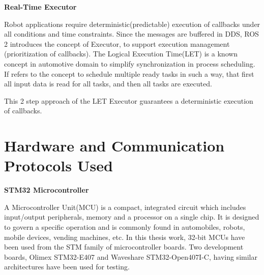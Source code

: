 \documentclass[%
xelatex,
	oneside,		%
	12pt,			%
	parskip=half,	%
	abstracton,
	chapterprefix=true%
    appendixprefix=true]
{scrbook}
\begin{document}
 
  \vspace*{0.5cm}
  
  {\bfseries Real-Time Executor}
  \vspace*{0.5cm}
  
  
Robot applications require deterministic(predictable) execution of callbacks under all conditions and time constraints. Since the messages are buffered in DDS, ROS 2  introduces the concept of Executor, to support execution management (prioritization of callbacks).
The Logical Execution Time(LET) is a known concept in automotive domain to simplify synchronization in process scheduling. If refers to the concept to schedule multiple ready tasks in such a way, that first all input data is read for all tasks, and then all tasks are executed.\cite{let}

This 2 step approach of the LET Executor guarantees a deterministic execution of callbacks.
 
	\section{Hardware and Communication Protocols Used}
	
	\vspace*{0.5cm}
	{\bfseries STM32 Microcontroller}
	
	
	\vspace*{0.5cm}
A Microcontroller Unit(MCU)	is a compact, integrated circuit which includes input/output peripherals, memory and a processor on a single chip. It is designed to govern a specific operation and is commonly found in automobiles, robots, mobile devices, vending machines, etc. In this thesis work, 32-bit MCUs have been used from the STM family of microcontroller boards. Two development boards, Olimex STM32-E407 and Waveshare STM32-Open407I-C, having similar architectures have been used for testing.
\end{document}
